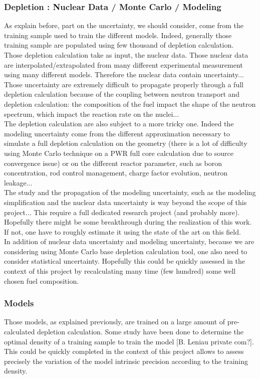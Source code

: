 \documentclass[dvips,12pt]{article}
\begin{document}
\subsubsection{Depletion : Nuclear Data / Monte Carlo / Modeling} %
As explain before, part on the uncertainty, we should consider, come from the training sample used to train the different models. Indeed, generally those training sample are populated using few thousand of depletion calculation.\\
Those depletion calculation take as input, the nuclear data. Those nuclear data are interpolated/extrapolated from many different experimental measurement using many different models. Therefore the nuclear data contain uncertainty...
Those uncertainty are extremely difficult to propagate properly through a full depletion calculation because of the coupling between neutron transport and depletion calculation: the composition of the fuel impact the shape of the neutron spectrum, which impact the reaction rate on the nuclei...\\
The depletion calculation are also subject to a more tricky one. Indeed the modeling uncertainty come from the different approximation necessary to simulate a full depletion calculation on the geometry (there is a lot of difficulty using Monte Carlo technique on a PWR full core calculation due to source convergence issue) or on the different reactor parameter, such as boron concentration, rod control management, charge factor evolution, neutron leakage...\\
The study and the propagation of the modeling uncertainty, such as the modeling simplification and the nuclear data uncertainty is way beyond the scope of this project... This require a full dedicated research project (and probably more).  Hopefully there might be some breakthrough during the realization of this work. If not, one have to roughly estimate it using the state of the art on this field. \\
In addition of nuclear data uncertainty and modeling uncertainty, because we are considering using Monte Carlo base depletion calculation tool, one also need to consider statistical uncertainty. Hopefully this could be quickly assessed in the context of this project by recalculating many time (few hundred) some well chosen fuel composition.\\



\subsubsection{Models}
Those models, as explained previously, are trained on a large amount of pre-calculated depletion calculation. Some study have been done to determine the optimal density of a training sample to train the model [B. Leniau private com?]. This could be quickly completed in the context of this project allows to assess precisely the variation of the model intrinsic precision according to the training density.\\
\end{document}
